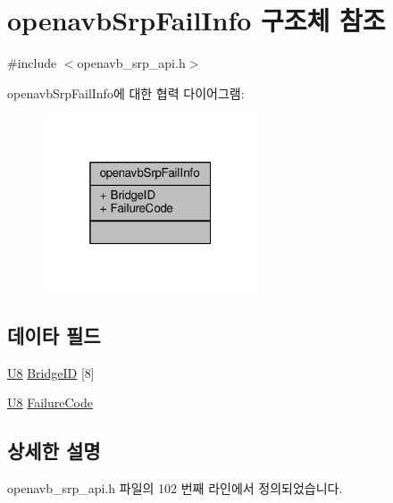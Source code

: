 \hypertarget{structopenavb_srp_fail_info}{}\section{openavb\+Srp\+Fail\+Info 구조체 참조}
\label{structopenavb_srp_fail_info}


{\ttfamily \#include $<$openavb\+\_\+srp\+\_\+api.\+h$>$}



openavb\+Srp\+Fail\+Info에 대한 협력 다이어그램\+:
\nopagebreak
\begin{figure}[H]
\begin{center}
\leavevmode
\includegraphics[width=181pt]{structopenavb_srp_fail_info__coll__graph}
\end{center}
\end{figure}
\subsection*{데이타 필드}
\begin{DoxyCompactItemize}
\item 
\hyperlink{openavb__types__base__pub_8h_aa63ef7b996d5487ce35a5a66601f3e73}{U8} \hyperlink{structopenavb_srp_fail_info_ac43b1d8c22addf9053c0dc573188dd81}{Bridge\+ID} \mbox{[}8\mbox{]}
\item 
\hyperlink{openavb__types__base__pub_8h_aa63ef7b996d5487ce35a5a66601f3e73}{U8} \hyperlink{structopenavb_srp_fail_info_a2a87e0fc692a78fcca21d2e9295f7b5c}{Failure\+Code}
\end{DoxyCompactItemize}


\subsection{상세한 설명}


openavb\+\_\+srp\+\_\+api.\+h 파일의 102 번째 라인에서 정의되었습니다.



